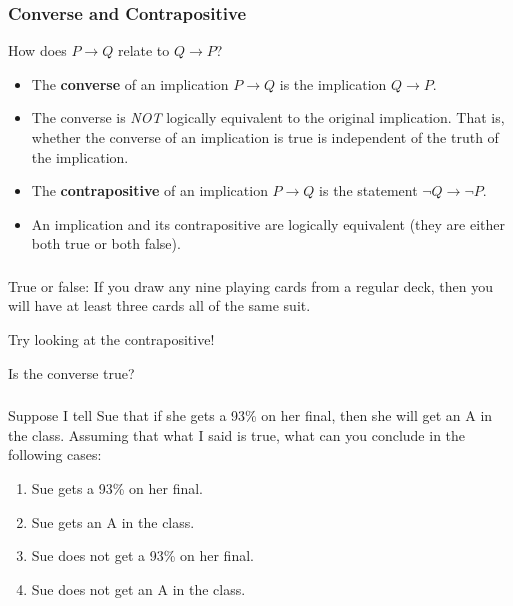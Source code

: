 \documentclass[11pt, compress]{beamer}
\newcommand{\terminology}[1]{\textbf{#1}}
\newcommand{\imp}{\rightarrow}
\begin{document}
\begin{frame}
\frametitle{Converse and Contrapositive}
 How does \(P \imp Q\) relate to \(Q \imp P\)?
\pause 

\begin{itemize}[<+->]
\item{} The \terminology{converse}  of an implication \(P \imp Q\) is the implication \(Q \imp P\).


\item{} The converse is \emph{NOT} logically equivalent to the original implication. That is, whether the converse of an implication is true is independent of the truth of the implication.


\item{} The \terminology{contrapositive} of an implication \(P \imp Q\) is the statement \(\neg Q \imp \neg P\).


\item{} An implication and its contrapositive are logically equivalent (they are either both true or both false).

\end{itemize}

\end{frame}
 
\begin{frame}
\frametitle{}
\begin{example}[0.2.5]True or false: If you draw any nine playing cards from a regular deck, then you will have at least three cards all of the same suit.

\pause \vfill 

Try looking at the contrapositive!

\pause \vfill 

Is the converse true?
\end{example}
\end{frame}
 
\begin{frame}
\frametitle{}
\begin{example}[0.2.6]Suppose I tell Sue that if she gets a 93\% on her final, then she will get an A in the class. Assuming that what I said is true, what can you conclude in the following cases:
\begin{enumerate}
\item{} Sue gets a 93\% on her final.


\item{} Sue gets an A in the class.


\item{} Sue does not get a 93\% on her final.


\item{} Sue does not get an A in the class.

\end{enumerate}

\end{example}
\end{frame}
 
\end{document}
